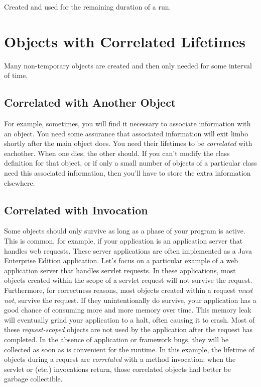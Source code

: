 Created and used for the remaining duration of a run.


\section{Objects with Correlated Lifetimes}

Many non-temporary objects are created and then only needed for some interval of
time.

\subsection{Correlated with Another Object}
\label{correlated-lifetime-1}


For example, sometimes, you will find it necessary to associate information with
an object. You need some assurance that associated information will exit limbo
shortly after the main object does. You need their lifetimes to be {\em
correlated} with eachother. When one dies, the other should. If you can't modify
the class definition for that object, or if only a small number of objects of a
particular class need this associated information, then you'll have to store the
extra information elsewhere.

\subsection{Correlated with Invocation}
\label{correlated-lifetime-2}

Some objects should only survive as long as a phase of your program is active.
This is common, for example, if your application is an application server that
handles web requests. These server applications are often implemented as a Java
Enterprise Edition application. Let's focus on a particular example of a web
application server that handles servlet requests. In these applications, most
objects created within the scope of a servlet request will not survive the
request. Furthermore, for correctness reasons, most objects created within a
request {\em must not}, survive the request. If they unintentionally do survive,
your application has a good chance of consuming more and more memory over time.
 This memory leak will eventually grind your application to a
halt, often causing it to crash. Most of these {\em request-scoped}
 objects are not used by the application after the
request has completed. In the absence of application or framework bugs, they will
be collected as soon as is convenient for the runtime. In this example, the
lifetime of objects during a request are {\em correlated} with a method
invocation: when the servlet  or  (etc.) invocations
return, those correlated objects had better be garbage collectible.

